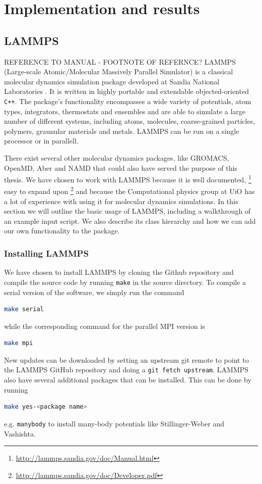 \documentclass[twoside,english]{uiofysmaster}
\begin{document}
\part{Implementation and results}

\chapter{LAMMPS} \label{sec:lammps}
REFERENCE TO MANUAL - FOOTNOTE OF REFERNCE?
LAMMPS (Large-scale Atomic/Molecular Massively Parallel Simulator)
is a classical molecular dynamics simulation package 
developed at Sandia National Laboratories \cite{Plimpton95}. It is written
in highly portable and extendable objected-oriented \texttt{C++}. 
The package's functionality encompasses a wide variety of 
potentials, atom types, integrators, thermostats and 
ensembles and are able to simulate a large number
of different systems, including atoms, molecules, 
coarse-grained particles, polymers, graunular materials
and metals. LAMMPS can be run on a single processor
or in parallell. 

There exist several other molecular dynamics packages, 
like GROMACS, OpenMD, Aber and NAMD that could also
have served the purpose of this thesis. We have chosen
to work with LAMMPS because it is well documented, 
\footnote{\href{http://lammps.sandia.gov/doc/Manual.html}{http://lammps.sandia.gov/doc/Manual.html}}
easy to expand upon \footnote{\href{http://lammps.sandia.gov/doc/Developer.pdf}{http://lammps.sandia.gov/doc/Developer.pdf}}
and because the Computational
physics group at UiO has a lot of experience with using
it for molecular dynamics simulations. 
In this section we will outline the basic usage of LAMMPS, including
a walkthrough of an example input script. We also describe its
class hierarchy and how we can add our own functionality
to the package.

\section{Installing LAMMPS}
We have chosen to install LAMMPS by cloning
the Github repository and compile the source
code by running \texttt{make} in the source directory. 
To compile a serial version of the software, we simply run
the command
\begin{lstlisting}[language=bash]
 make serial
\end{lstlisting}
while the corresponding command for the parallel
MPI version is
\begin{lstlisting}[language=bash]
 make mpi
\end{lstlisting}
New updates can be downloaded by setting an
upstream git remote to point to the LAMMPS
GitHub repository and doing a \texttt{git fetch upstream}. 
LAMMPS also have several additional packages that
can be installed. This can be done by running
\begin{lstlisting}[language=bash]
 make yes-<package name>
\end{lstlisting}
e.g. \texttt{manybody} to install many-body potentials
like Stillinger-Weber and Vashishta. 
\end{document}
